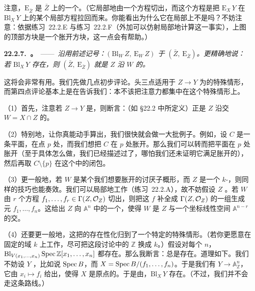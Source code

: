 注意，$\mathrm{E}_{\bar{Z}}$ 是 $\bar{Z}$ 上的一个\trEffectiveCartierDivisor。（它局部地由一个方程切出，而这个方程是把 $\mathrm{E}_X\,Y$ 在 $\mathrm{Bl}_X\,Y$ 上的某个局部方程拉回而来。你能看出为什么它在局部上不是\trZerodivisor{}吗？不妨注意：依据\mbox{练习~22.2.E} 与\mbox{练习~22.2.F}（外加\trBlowup{}可以仿射局部地计算这一事实），上图的顶部方块是一个胀开方块，这一点会有帮助。）

\textbf{22.2.7.\ \trBlowupClosureLemma。}\ ——\ \emph{沿用前述记号：$(\mathrm{Bl}_W\,Z,\ \mathrm{E}_W\,Z)$ \trCanonically\trIsomorphic{}于 $(\bar{Z},\ \mathrm{E}_{\bar{Z}})$。更精确地说：若\trBlowup{} $\mathrm{Bl}_X\,Y$ 存在，则 $(\bar{Z},\ \mathrm{E}_{\bar{Z}})$ 就是 $Z$ 沿 $W$ 的\trBlowup。}

这将会非常有用。我们先做几点初步评论。头三点适用于 $Z\to Y$ 为\trClosedEmbedding{}的特殊情形，而第四点评论基本上是在告诉我们：本不该把注意力都集中在这个特殊情形上。

（1）首先，注意若 $Z\to Y$ 是\trClosedEmbedding，则\mbox{\trBlowupClosureLemma}断言：\trProperTransform{}（如 \S22.2 中所定义）正是 $Z$ 沿\trSchemeTheoretic{}交 $W=X\cap Z$ 的\trBlowup。

（2）特别地，\mbox{\trBlowupClosureLemma}让你真能动手算出\trBlowup，我们很快就会做一大批例子。例如，设 $C$ 是一条平面\trCurve，在点 $p$ 处\trSingular，而我们想把 $C$ 在 $p$ 处胀开。那么我们可以转而把平面在 $p$ 处胀开（至于具体怎么做，我们已经描述过了，哪怕我们还未证明它满足胀开的\trUniversalProperty），然后再取 $C\setminus\{p\}$ 在这个\trBlowup{}中的\trSchemeTheoretic{}闭包。

（3）更一般地，若 $W$ 是某个我们想要胀开的讨厌子概形，而 $Z$ 是一个\trFiniteType{} $k$-\trScheme，则同样的技巧也能奏效。我们可以局部地工作（\mbox{练习~22.2.A}），故不妨假设 $Z$ \trAffine。若 $W$ 由 $r$ 个方程 $f_1,\dots,f_r\in\Gamma(Z,\mathcal{O}_Z)$ 切出，则把这 $f$ 补全成 $\Gamma(Z,\mathcal{O}_Z)$ 的一组生成元 $f_1,\dots,f_n$。这给出 $Z$ 向 $\mathbb{A}^n$ 中的一个\trClosedEmbedding，使得 $W$ 是 $Z$ 与一个坐标线性空间 $\mathbb{A}^{n-r}$ 的\trSchemeTheoretic{}交。

（4）还要更一般地，这把\trBlowup{}的存在性化归到了一个特定的特殊情形。（若你更愿意在固定的域 $k$ 上工作，尽可把这段讨论中的 $\mathbb{Z}$ 换成 $k$。）假设对每个 $n$，$\mathrm{Bl}_{V(x_1,\dots,x_n)}\operatorname{Spec}\mathbb{Z}[x_1,\dots,x_n]$ 都存在。那么我断言：\trBlowup{}总是存在。道理如下。我们不妨设 $Y$ \trAffine，比如说 $\operatorname{Spec} B$，而 $X=\operatorname{Spec} B/(f_1,\dots,f_n)$。于是我们有\trMorphism{} $Y\to\mathbb{A}^n_{\mathbb{Z}}$，它由 $x_i\mapsto f_i$ 给出，使得 $X$ 是原点的\trSchemeTheoreticPreimage。于是由\mbox{\trBlowupClosureLemma}，$\mathrm{Bl}_X\,Y$ 存在。（不过，我们并不会走这条路线。）

